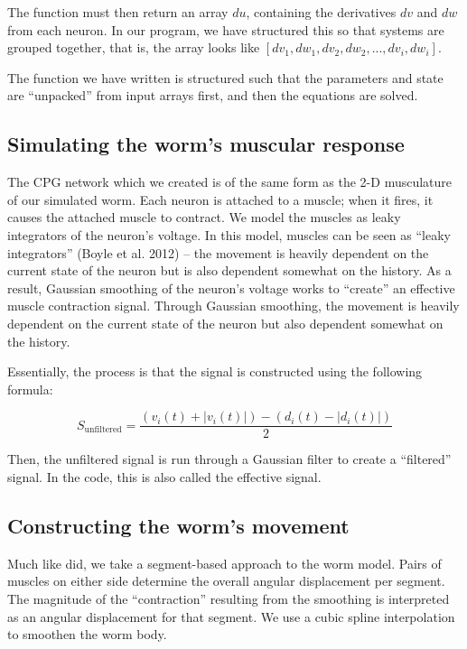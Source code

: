 \documentclass[
    11pt,
]{article}
\begin{document}
The function must then return an array $du$, containing the derivatives $dv$ and $dw$ from each neuron.  In our program, we have structured this so that systems are grouped together, that is, the array looks like $\left[dv_1, dw_1, dv_2, dw_2, ..., dv_i, dw_i\right]$.

The function we have written is structured such that the parameters and state are ``unpacked'' from input arrays first, and then the equations are solved.

\subsection{Simulating the worm's muscular response}

The CPG network which we created is of the same form as the 2-D musculature of our simulated worm.  Each neuron is attached to a muscle; when it fires, it causes the attached muscle to contract.  We model the muscles as leaky integrators of the neuron's voltage. In this model, muscles can be seen as “leaky integrators” (Boyle et al. 2012) – the movement is heavily dependent on the current state of the neuron but is also dependent somewhat on the history. As a result, Gaussian smoothing of the neuron's voltage works to ``create'' an effective muscle contraction signal.  Through Gaussian smoothing, the movement is heavily dependent on the current state of the neuron but also dependent somewhat on the history.

Essentially, the process is that the signal is constructed using the following formula:

\begin{equation}
    \label{eq: unfiltered_signal}
    S_\mathrm{unfiltered} = \frac{(v_i(t) + |v_i(t)|) - (d_i(t) - |d_i(t)|)}{2}
\end{equation}

Then, the unfiltered signal is run through a Gaussian filter to create a ``filtered'' signal.  In the code, this is also called the effective signal.


\subsection{Constructing the worm's movement}

Much like \citet{izquierdo2018} did, we take a segment-based approach to the worm model.  Pairs of muscles on either side determine the overall angular displacement per segment.  The magnitude of the “contraction” resulting from the smoothing is interpreted as an angular displacement for that segment.  We use a cubic spline interpolation to smoothen the worm body.
\end{document}
